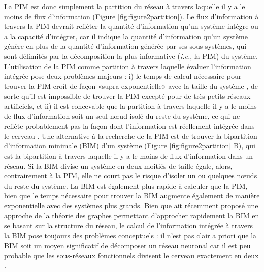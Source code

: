 La PIM est donc simplement la partition du réseau à travers laquelle il y a le moins de flux d'information (Figure \ref{fig:figure2partition}). 
Le flux d'information à travers la PIM devrait refléter la quantité d'information qu'un système intègre ou a la capacité d'intégrer, car il indique la quantité d'information qu'un système génère en plus de la quantité d'information générée par ses sous-systèmes, qui sont délimités par la décomposition la plus informative (\textit{i.e.}, la PIM) du système. 
L'utilisation de la PIM comme partition à travers laquelle évaluer l'information intégrée pose deux problèmes majeurs : i) le temps de calcul nécessaire pour trouver la PIM croît de façon «supra-exponentielle» avec la taille du système \citep{tegmark2016improved}, de sorte qu'il est impossible de trouver la PIM excepté pour de très petits réseaux artificiels, et ii) il est concevable que la partition à travers laquelle il y a le moins de flux d'information soit un seul nœud isolé du reste du système, ce qui ne reflète probablement pas la façon dont l'information est réellement intégrée dans le cerveau \citep{toker2016moving}. 
Une alternative à la recherche de la PIM est de trouver la bipartition d'information minimale (BIM) d'un système (Figure \ref{fig:figure2partition} B), qui est la bipartition à travers laquelle il y a le moins de flux d'information dans un réseau. 
Si la BIM divise un système en deux moitiés de taille égale, alors, contrairement à la PIM, elle ne court pas le risque d'isoler un ou quelques nœuds du reste du système. 
La BIM est également plus rapide à calculer que la PIM, bien que le temps nécessaire pour trouver la BIM augmente également de manière exponentielle avec des systèmes plus grands. 
Bien que \cite{tegmark2016improved} ait récemment proposé une approche de la théorie des graphes permettant d'approcher rapidement la BIM en se basant sur la structure du réseau, le calcul de l'information intégrée à travers la BIM pose toujours des problèmes conceptuels : il n'est pas clair a priori que la BIM soit un moyen significatif de décomposer un réseau neuronal car il est peu probable que les sous-réseaux fonctionnels divisent le cerveau exactement en deux \citep{toker2016moving}.

